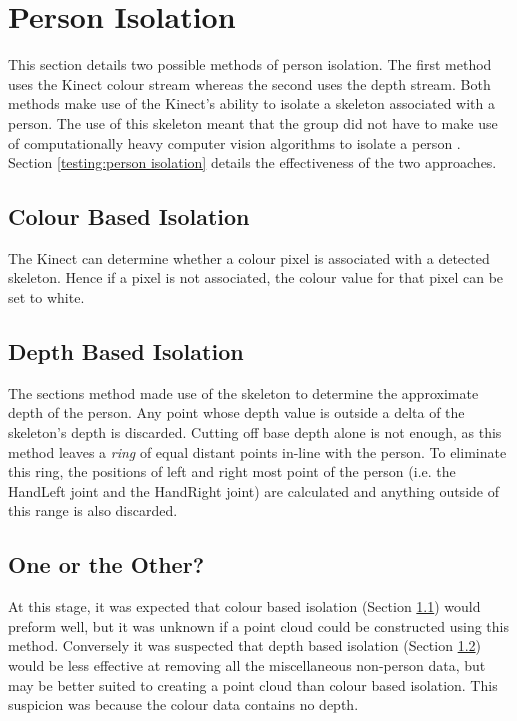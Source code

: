 \section{Person Isolation}
\label{design:person isolation}
This section details two possible methods of person isolation.
The first method uses the Kinect colour stream whereas the second uses the depth stream.
Both methods make use of the Kinect's ability to isolate a skeleton associated with a person.
The use of this skeleton meant that the group did not have to make use of computationally heavy computer vision algorithms to isolate a person .\\

Section \ref{testing:person isolation} details the effectiveness of the two approaches.

\subsection{Colour Based Isolation}
\label{design:colour based isolation}
The Kinect can determine whether a colour pixel is associated with a detected skeleton. Hence if a pixel is not associated, the colour value for that pixel can be set to white.\\

\subsection{Depth Based Isolation}
\label{design:depth based isolation}
The sections method made use of the skeleton to determine the approximate depth of the person. 
Any point whose depth value is outside a delta of the skeleton's depth is discarded.
Cutting off base depth alone is not enough, as this method leaves a \textit{ring} of equal distant points in-line with the person. 
To eliminate this ring, the positions of left and right most point of the person (i.e. the HandLeft joint and the HandRight joint) are calculated and anything outside of this range is also discarded. \\

\subsection{One or the Other?}
\label{design:one or the other?}
At this stage, it was expected that colour based isolation (Section \ref{design:colour based isolation}) would preform well, but it was unknown if a point cloud could be constructed using this method. 
Conversely it was suspected that depth based isolation (Section \ref{design:depth based isolation}) would be less effective at removing all the miscellaneous non-person data, but may be better suited to creating a point cloud than colour based isolation. This suspicion was because the colour data contains no depth.\\ 